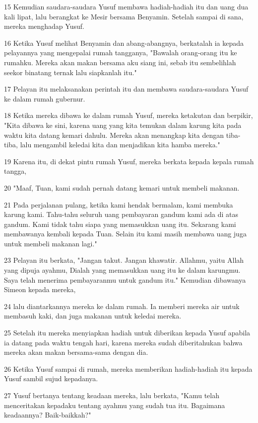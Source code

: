 \par 15 Kemudian saudara-saudara Yusuf membawa hadiah-hadiah itu dan uang dua kali lipat, lalu berangkat ke Mesir bersama Benyamin. Setelah sampai di sana, mereka menghadap Yusuf.
\par 16 Ketika Yusuf melihat Benyamin dan abang-abangnya, berkatalah ia kepada pelayannya yang mengepalai rumah tangganya, "Bawalah orang-orang itu ke rumahku. Mereka akan makan bersama aku siang ini, sebab itu sembelihlah seekor binatang ternak lalu siapkanlah itu."
\par 17 Pelayan itu melaksanakan perintah itu dan membawa saudara-saudara Yusuf ke dalam rumah gubernur.
\par 18 Ketika mereka dibawa ke dalam rumah Yusuf, mereka ketakutan dan berpikir, "Kita dibawa ke sini, karena uang yang kita temukan dalam karung kita pada waktu kita datang kemari dahulu. Mereka akan menangkap kita dengan tiba-tiba, lalu mengambil keledai kita dan menjadikan kita hamba mereka."
\par 19 Karena itu, di dekat pintu rumah Yusuf, mereka berkata kepada kepala rumah tangga,
\par 20 "Maaf, Tuan, kami sudah pernah datang kemari untuk membeli makanan.
\par 21 Pada perjalanan pulang, ketika kami hendak bermalam, kami membuka karung kami. Tahu-tahu seluruh uang pembayaran gandum kami ada di atas gandum. Kami tidak tahu siapa yang memasukkan uang itu. Sekarang kami membawanya kembali kepada Tuan. Selain itu kami masih membawa uang juga untuk membeli makanan lagi."
\par 23 Pelayan itu berkata, "Jangan takut. Jangan khawatir. Allahmu, yaitu Allah yang dipuja ayahmu, Dialah yang memasukkan uang itu ke dalam karungmu. Saya telah menerima pembayaranmu untuk gandum itu." Kemudian dibawanya Simeon kepada mereka,
\par 24 lalu diantarkannya mereka ke dalam rumah. Ia memberi mereka air untuk membasuh kaki, dan juga makanan untuk keledai mereka.
\par 25 Setelah itu mereka menyiapkan hadiah untuk diberikan kepada Yusuf apabila ia datang pada waktu tengah hari, karena mereka sudah diberitahukan bahwa mereka akan makan bersama-sama dengan dia.
\par 26 Ketika Yusuf sampai di rumah, mereka memberikan hadiah-hadiah itu kepada Yusuf sambil sujud kepadanya.
\par 27 Yusuf bertanya tentang keadaan mereka, lalu berkata, "Kamu telah menceritakan kepadaku tentang ayahmu yang sudah tua itu. Bagaimana keadaannya? Baik-baikkah?"
